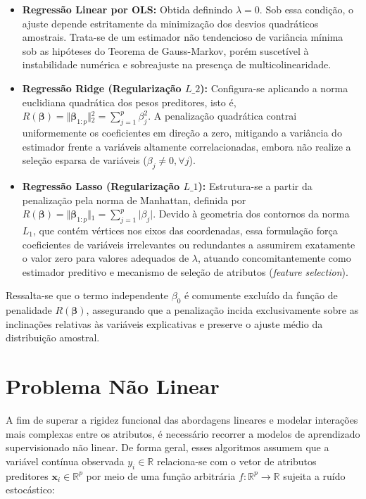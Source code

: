 \begin{itemize}
    \item \textbf{Regressão Linear por \gls{OLS}:} Obtida definindo $\lambda = 0$. Sob essa condição, o ajuste depende estritamente da minimização dos desvios quadráticos amostrais. Trata-se de um estimador não tendencioso de variância mínima sob as hipóteses do Teorema de Gauss-Markov, porém suscetível à instabilidade numérica e sobreajuste na presença de multicolinearidade.
    
    \item \textbf{Regressão Ridge (Regularização $L\_2$):} Configura-se aplicando a norma euclidiana quadrática dos pesos preditores, isto é, $R(\boldsymbol{\beta}) = \Vert{}\boldsymbol{\beta}_{1:p}\Vert{}_2^2 = \sum_{j=1}^{p} \beta_j^2$. A penalização quadrática contrai uniformemente os coeficientes em direção a zero, mitigando a variância do estimador frente a variáveis altamente correlacionadas, embora não realize a seleção esparsa de variáveis ($\beta_j \neq 0, \forall j$).

    \item \textbf{Regressão Lasso (Regularização $L\_1$):} Estrutura-se a partir da penalização pela norma de Manhattan, definida por $R(\boldsymbol{\beta}) = \Vert{}\boldsymbol{\beta}_{1:p}\Vert{}_1 = \sum_{j=1}^{p} \vert{}\beta_j\vert{}$. Devido à geometria dos contornos da norma $L_1$, que contém vértices nos eixos das coordenadas, essa formulação força coeficientes de variáveis irrelevantes ou redundantes a assumirem exatamente o valor zero para valores adequados de $\lambda$, atuando concomitantemente como estimador preditivo e mecanismo de seleção de atributos (\textit{feature selection}).
\end{itemize}

Ressalta-se que o termo independente $\beta_0$ é comumente excluído da função de penalidade $R(\boldsymbol{\beta})$, assegurando que a penalização incida exclusivamente sobre as inclinações relativas às variáveis explicativas e preserve o ajuste médio da distribuição amostral.

\section{Problema Não Linear}

A fim de superar a rigidez funcional das abordagens lineares e modelar interações mais complexas entre os atributos, é necessário recorrer a modelos de aprendizado supervisionado não linear. De forma geral, esses algoritmos assumem que a variável contínua observada $y_i \in \mathbb{R}$ relaciona-se com o vetor de atributos preditores $\mathbf{x}_i \in \mathbb{R}^p$ por meio de uma função arbitrária $f: \mathbb{R}^p \to \mathbb{R}$ sujeita a ruído estocástico:

